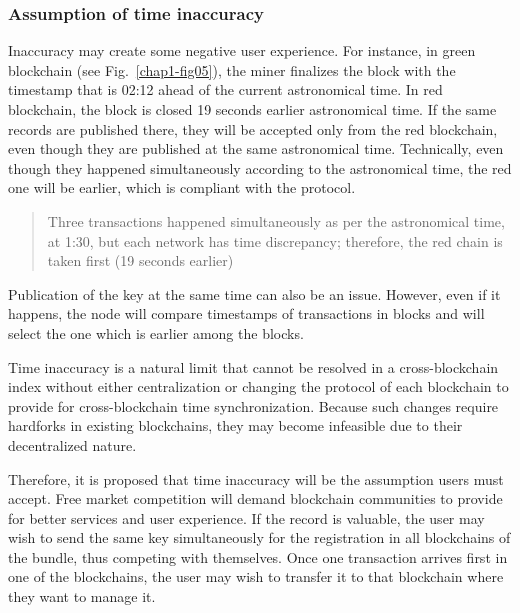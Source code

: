 \begin{multicols}{2}
\subsubsection{Assumption of time inaccuracy}\label{subsubsec-4.3.2}

Inaccuracy may create some negative user experience. For instance, in green blockchain (see Fig.~\ref{chap1-fig05}), the miner finalizes the block with the timestamp that is 02:12 ahead of the current astronomical time. In red blockchain, the block is closed 19 seconds earlier astronomical time. If the same records are published there, they will be accepted only from the red blockchain, even though they are published at the same astronomical time. Technically, even though they happened simultaneously according to the astronomical time, the red one will be earlier, which is compliant with the protocol.

\begin{quote}
Three transactions happened simultaneously as per the astronomical time, at 1:30, but each network has time discrepancy; therefore, the red chain is taken first (19 seconds earlier)
\end{quote}

Publication of the key at the same time can also be an issue. However, even if it happens, the node will compare timestamps of transactions in blocks and will select the one which is earlier among the blocks.

Time inaccuracy is a natural limit that cannot be resolved in a cross-blockchain index without either centralization or changing the protocol of each blockchain to provide for cross-blockchain time synchronization. Because such changes require hardforks in existing blockchains, they may become infeasible due to their decentralized nature.

Therefore, it is proposed that time inaccuracy will be the assumption users must accept. Free market competition will demand blockchain communities to provide for better services and user experience. If the record is valuable, the user may wish to send the same key simultaneously for the registration in all blockchains of the bundle, thus competing with themselves. Once one transaction arrives first in one of the blockchains, the user may wish to transfer it to that blockchain where they want to manage it.


\end{multicols}

